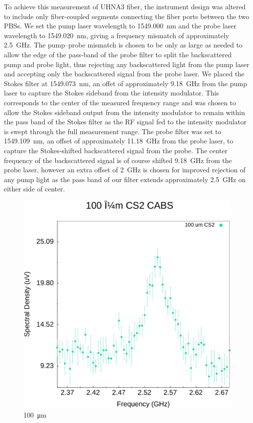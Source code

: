 To achieve this measurement of \ac{UHNA3} fiber, the instrument design was altered to include only fiber-coupled segments connecting the fiber ports between the two \ac{PBS}s. We set the pump laser wavelength to \SI{1549.000}{\nano\meter} and the probe laser wavelength to \SI{1549.020}{\nano\meter}, giving a frequency mismatch of approximately \SI{2.5}{\giga\hertz}. The pump--probe mismatch is chosen to be only as large as needed to allow the edge of the pass-band of the probe filter to split the backscattered pump and probe light, thus rejecting any backscattered light from the pump laser and accepting only the backscattered signal from the probe laser. We placed the Stokes filter at \SI{1549.073}{\nano\meter}, an offet of approximately \SI{9.18}{\giga\hertz} from the pump laser to capture the Stokes sideband from the intensity modulator. This corresponds to the center of the measured frequency range and was chosen to allow the Stokes sideband output from the intensity modulator to remain within the pass band of the Stokes filter as the RF signal fed to the intensity modulator is swept through the full measurement range. The probe filter was set to \SI{1549.109}{\nano\meter}, an offset of approximately \SI{11.18}{\giga\hertz} from the probe laser, to capture the Stokes-shifted backscattered signal from the probe. The center frequency of the backscattered signal is of course shifted \SI{9.18}{\giga\hertz} from the probe laser, however an extra offset of \SI{2}{\giga\hertz} is chosen for improved rejection of any pump light as the pass band of our filter extends approximately \SI{2.5}{\giga\hertz} on either side of center.

\begin{figure}[t!]
  \centering
  \includegraphics[width=\textwidth]{figs/4-CoBS/100umCS2.pdf}
  \caption{\SI{100}{\micro\meter} }
  \label{fig:100umCS2}
\end{figure}

